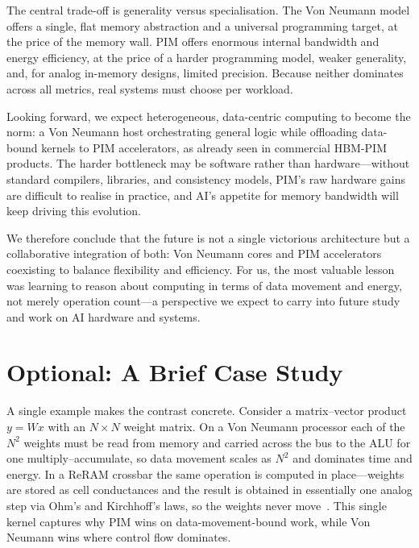 \documentclass{article} %
\begin{document}
The central trade-off is generality versus specialisation. The Von Neumann
model offers a single, flat memory abstraction and a universal programming
target, at the price of the memory wall. PIM offers enormous internal bandwidth
and energy efficiency, at the price of a harder programming model, weaker
generality, and, for analog in-memory designs, limited precision. Because
neither dominates across all metrics, real systems must choose per workload.

Looking forward, we expect heterogeneous, data-centric computing to become the
norm: a Von Neumann host orchestrating general logic while offloading data-bound
kernels to PIM accelerators, as already seen in commercial HBM-PIM products. The
harder bottleneck may be software rather than hardware---without standard
compilers, libraries, and consistency models, PIM's raw hardware gains are
difficult to realise in practice, and AI's appetite for memory bandwidth will
keep driving this evolution.

We therefore conclude that the future is not a single victorious architecture
but a collaborative integration of both: Von Neumann cores and PIM accelerators
coexisting to balance flexibility and efficiency. For us, the most valuable
lesson was learning to reason about computing in terms of data movement and
energy, not merely operation count---a perspective we expect to carry into
future study and work on AI hardware and systems.

\section{Optional: A Brief Case Study}
\label{sec:case}
A single example makes the contrast concrete. Consider a matrix--vector product
$y = Wx$ with an $N\times N$ weight matrix. On a Von Neumann processor each of
the $N^2$ weights must be read from memory and carried across the bus to the ALU
for one multiply--accumulate, so data movement scales as $N^2$ and dominates
time and energy. In a ReRAM crossbar the same operation is computed in
place---weights are stored as cell conductances and the result is obtained in
essentially one analog step via Ohm's and Kirchhoff's laws, so the weights never
move~\citep{shafiee2016isaac,sebastian2020memory}. This single kernel captures
why PIM wins on data-movement-bound work, while Von Neumann wins where control
flow dominates.
\end{document}
